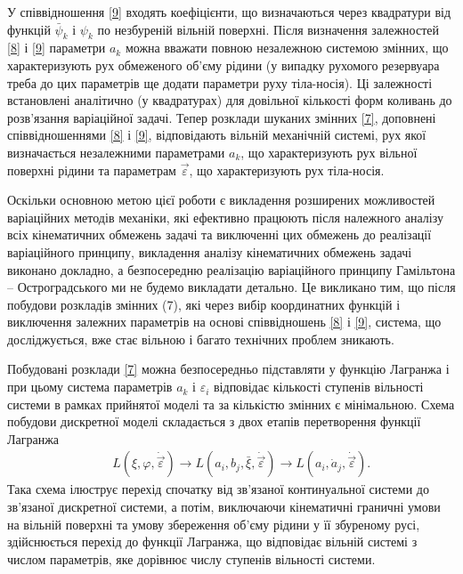 \documentclass[11pt, reqno]{amsart}
\begin{document}
У співвідношення \eqref{9} входять коефіцієнти, що визначаються через квадратури від функцій $\bar \psi_k$ і $\psi_k$  по незбуреній вільній поверхні. Після визначення залежностей \eqref{8} і \eqref{9} параметри $a_k$  можна вважати повною незалежною системою змінних, що характеризують рух обмеженого об'єму рідини (у випадку рухомого резервуара треба до цих параметрів ще додати параметри руху тіла-носія). Ці залежності встановлені аналітично (у квадратурах) для довільної кількості форм коливань до розв'язання варіаційної задачі. Тепер розклади шуканих змінних \eqref{7}, доповнені співвідношеннями \eqref{8} і \eqref{9}, відповідають вільній механічній системі, рух якої визначається незалежними параметрами $a_k$, що характеризують рух вільної поверхні рідини та  параметрам $\vec \varepsilon$, що характеризують рух тіла-носія.

Оскільки основною метою цієї роботи є викладення розширених можливостей варіаційних методів механіки, які ефективно працюють після належного аналізу всіх кінематичних обмежень задачі та виключенні цих обмежень до реалізації варіаційного принципу, викладення аналізу кінематичних обмежень задачі виконано докладно, а безпосередню реалізацію варіаційного принципу Гамільтона -- Остроградського ми не будемо викладати детально. Це викликано тим, що після побудови розкладів змінних (7), які через вибір координатних функцій і виключення залежних параметрів на основі співвідношень \eqref{8} і \eqref{9}, система, що досліджується, вже стає вільною і багато технічних проблем зникають.

Побудовані розклади \eqref{7} можна безпосередньо підставляти у функцію Лагранжа і при цьому система параметрів $a_k$ і $\varepsilon_i$ відповідає кількості ступенів вільності системи в рамках прийнятої моделі та за кількістю змінних є мінімальною.
Схема побудови дискретної моделі складається з двох етапів перетворення функції Лагранжа
\begin{eqnarray*}
    &&L(\xi, \varphi, \dot {\vec \varepsilon}) \rightarrow L(a_i, b_j, \bar \xi, \dot {\vec \varepsilon})\rightarrow L(a_i, \dot a_j, \dot {\vec \varepsilon}).
\end{eqnarray*}
Така схема ілюструє перехід спочатку від зв'язаної континуальної системи до зв'язаної дискретної системи, а потім, виключаючи кінематичні граничні умови на вільній поверхні та умову збереження об'єму рідини у її збуреному русі, здійснюється перехід до функції Лагранжа, що відповідає вільній системі з  числом параметрів, яке дорівнює числу ступенів вільності системи.
\end{document}
